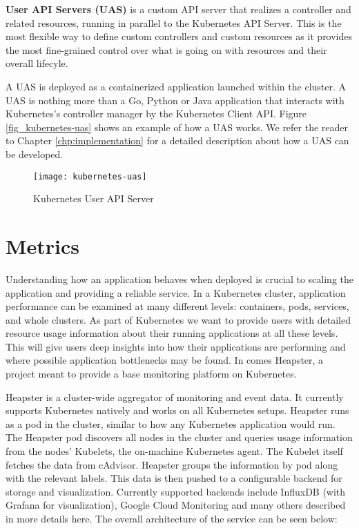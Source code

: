 \textbf{User API Servers (UAS)} is a custom API server that realizes a controller and related resources, running in parallel to the Kubernetes API Server.
This is the most flexible way to define custom controllers and custom resources as it provides the most fine-grained control over what is going on with resources and their overall lifecyle.

A UAS is deployed as a containerized application launched within the cluster. 
%
A UAS is nothing more than a Go, Python or Java application that interacts with Kubernetes's controller manager by the Kubernetes Client API.
%
Figure \ref{fig_kubernetes-uas} shows an example of how a UAS works.
%
We refer the reader to Chapter \ref{chp:implementation} for a detailed description about how a UAS can be developed.

\begin{figure}	
	\label{fig:kubernetes-uas}
	\centering
	\texttt{[image: kubernetes-uas]}
	\caption{Kubernetes User API Server}
\end{figure}


\section{Metrics}
\label{sec:kubernetes-metrics}
Understanding how an application behaves when deployed is crucial to scaling the application and providing a reliable service. In a Kubernetes cluster, application performance can be examined at many different levels: containers, pods, services, and whole clusters. As part of Kubernetes we want to provide users with detailed resource usage information about their running applications at all these levels. This will give users deep insights into how their applications are performing and where possible application bottlenecks may be found. In comes Heapster, a project meant to provide a base monitoring platform on Kubernetes.

Heapster is a cluster-wide aggregator of monitoring and event data. It currently supports Kubernetes natively and works on all Kubernetes setups. Heapster runs as a pod in the cluster, similar to how any Kubernetes application would run. The Heapster pod discovers all nodes in the cluster and queries usage information from the nodes’ Kubelets, the on-machine Kubernetes agent. The Kubelet itself fetches the data from cAdvisor. Heapster groups the information by pod along with the relevant labels. This data is then pushed to a configurable backend for storage and visualization. Currently supported backends include InfluxDB (with Grafana for visualization), Google Cloud Monitoring and many others described in more details here. The overall architecture of the service can be seen below:

